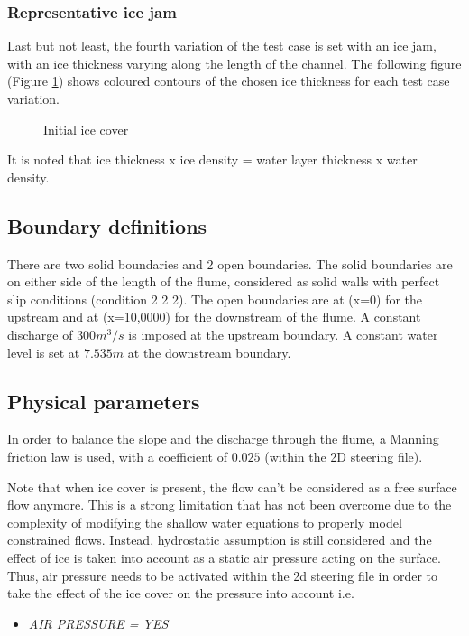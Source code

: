 \subsubsection{Representative ice jam}
Last but not least, the fourth variation of the test case is set with an ice jam, with an ice thickness varying along the length of the channel. The following  figure (Figure \ref{fig:ini-cover_04}) shows coloured contours of the chosen ice thickness for each test case variation.

\begin{figure}[H]
    \begin{center}
    \end{center}
    \caption{Initial ice cover}
    \label{fig:ini-cover_04}
\end{figure}

It is noted that ice thickness x ice density = water layer thickness x water density.

\subsection{Boundary definitions}
There are two solid boundaries and 2 open boundaries.
The solid boundaries are on either side of the length of the flume, considered as solid walls with perfect slip conditions (condition 2 2 2).
The open boundaries are at (x=0) for the upstream and at (x=10,0000) for the downstream of the flume. A constant discharge of $300m^3/s$ is imposed at the upstream boundary. A constant water level is set at $7.535m$ at the downstream boundary.

\subsection{Physical parameters}
%
In order to balance the slope and the discharge through the flume, a Manning friction law is used, with a coefficient of $0.025$ (within the \telemac2D steering file).

Note that when ice cover is present, the flow can't be considered as a free surface flow anymore.
This is a strong limitation that has not been overcome due to the complexity of modifying the shallow water equations to properly model constrained flows. Instead, hydrostatic assumption is still considered
and the effect of ice is taken into account as a static air pressure acting on the surface.
Thus, air pressure needs to be activated within the \telemac2d steering file in order to take the effect
of the ice cover on the pressure into account i.e.
\begin{itemize}
    \item\textit{AIR PRESSURE = YES}
\end{itemize}

